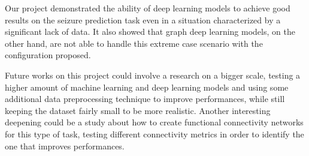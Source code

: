 Our project demonstrated the ability of deep learning models to achieve good results on the seizure prediction task even in a situation characterized by a significant lack of data. It also showed that graph deep learning models, on the other hand, are not able to handle this extreme case scenario with the configuration proposed.

Future works on this project could involve a research on a bigger scale, testing a higher amount of machine learning and deep learning models and using some additional data preprocessing technique to improve performances, while still keeping the dataset fairly small to be more realistic. Another interesting deepening could be a study about how to create functional connectivity networks for this type of task, testing different connectivity metrics in order to identify the one that improves performances. 